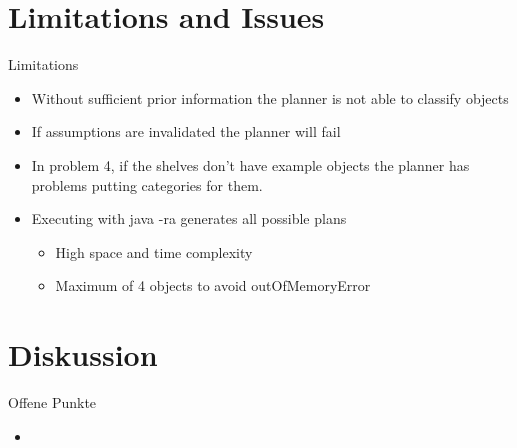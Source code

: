 \documentclass{beamer}
\begin{document}
\section{Limitations and Issues}

\begin{frame}{Limitations}
  \begin{itemize}
    \item Without sufficient prior information the planner is not able to classify objects
    \item If assumptions are invalidated the planner will fail
    \item In problem 4, if the shelves don't have example objects  the planner has problems putting categories for them.
    \item Executing with java -ra generates all possible plans
      \begin{itemize}
        \item High space and time complexity
        \item Maximum of 4 objects to avoid outOfMemoryError
      \end{itemize}
  \end{itemize}
\end{frame}


\section{Diskussion}

\begin{frame}{Offene Punkte}
  \begin{itemize}

    \item
  \end{itemize}
\end{frame}


%
\end{document}
